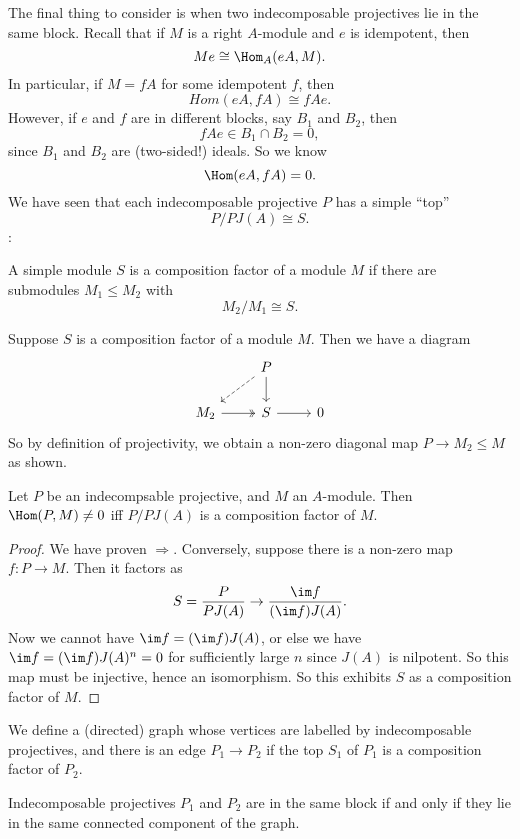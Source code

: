 \documentclass[a4paper]{article}
\begin{document}
The final thing to consider is when two indecomposable projectives lie in the same block. Recall that if $M$ is a right $A$-module and $e$ is idempotent, then
\[
  Me \cong \Hom_A(eA, M).
\]
In particular, if $M = fA$ for some idempotent $f$, then
\[
  Hom(eA, fA) \cong fAe.
\]
However, if $e$ and $f$ are in different blocks, say $B_1$ and $B_2$, then
\[
  fAe \in B_1 \cap B_2 = 0,
\]
since $B_1$ and $B_2$ are (two-sided!) ideals. So we know
\[
  \Hom(eA, fA) = 0.
\]
We have seen that each indecomposable projective $P$ has a simple ``top''
\[
  P/PJ(A) \cong S.
\]
:\begin{defi}
  A simple module $S$ is a composition factor of a module $M$ if there are submodules $M_1 \leq M_2$ with
  \[
    M_2/M_1 \cong S.
  \]
\end{defi}
Suppose $S$ is a composition factor of a module $M$. Then we have a diagram
\[
  \begin{tikzcd}
    & P \ar[d] \ar[dl, dashed]\\
     M_2 \ar[r, two heads ] & S \ar[r] & 0
  \end{tikzcd}
\]
So by definition of projectivity, we obtain a non-zero diagonal map $P \to M_2 \leq M$ as shown.

\begin{lemma}
  Let $P$ be an indecompsable projective, and $M$ an $A$-module. Then $\Hom(P, M) \not= 0$ iff $P/P J(A)$ is a composition factor of $M$.
\end{lemma}

\begin{proof}
  We have proven $\Rightarrow$. Conversely, suppose there is a non-zero map $f: P \to M$. Then it factors as
  \[
    S = \frac{P}{PJ(A)} \to \frac{\im f}{(\im f)J(A)}.
  \]
  Now we cannot have $\im f = (\im f)J(A)$, or else we have $\im f = (\im f)J(A)^n = 0$ for sufficiently large $n$ since $J(A)$ is nilpotent. So this map must be injective, hence an isomorphism. So this exhibits $S$ as a composition factor of $M$.
\end{proof}

We define a (directed) graph whose vertices are labelled by indecomposable projectives, and there is an edge $P_1 \to P_2$ if the top $S_1$ of $P_1$ is a composition factor of $P_2$.
\begin{thm}
  Indecomposable projectives $P_1$ and $P_2$ are in the same block if and only if they lie in the same connected component of the graph.
\end{thm}
\end{document}

